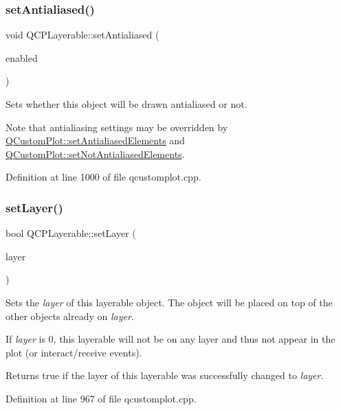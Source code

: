 \subsubsection{\texorpdfstring{set\+Antialiased()}{setAntialiased()}}
{\footnotesize\ttfamily void Q\+C\+P\+Layerable\+::set\+Antialiased (\begin{DoxyParamCaption}\item[{bool}]{enabled }\end{DoxyParamCaption})}

Sets whether this object will be drawn antialiased or not.

Note that antialiasing settings may be overridden by \hyperlink{class_q_custom_plot_af6f91e5eab1be85f67c556e98c3745e8}{Q\+Custom\+Plot\+::set\+Antialiased\+Elements} and \hyperlink{class_q_custom_plot_ae10d685b5eabea2999fb8775ca173c24}{Q\+Custom\+Plot\+::set\+Not\+Antialiased\+Elements}. 

Definition at line 1000 of file qcustomplot.\+cpp.

\mbox{\label{class_q_c_p_layerable_ab0d0da6d2de45a118886d2c8e16d5a54}} 
\subsubsection{\texorpdfstring{set\+Layer()}{setLayer()}\hspace{0.1cm}{\footnotesize\ttfamily [1/2]}}
{\footnotesize\ttfamily bool Q\+C\+P\+Layerable\+::set\+Layer (\begin{DoxyParamCaption}\item[{\hyperlink{class_q_c_p_layer}{Q\+C\+P\+Layer} $\ast$}]{layer }\end{DoxyParamCaption})}

Sets the {\itshape layer} of this layerable object. The object will be placed on top of the other objects already on {\itshape layer}.

If {\itshape layer} is 0, this layerable will not be on any layer and thus not appear in the plot (or interact/receive events).

Returns true if the layer of this layerable was successfully changed to {\itshape layer}. 

Definition at line 967 of file qcustomplot.\+cpp.

\mbox{\label{class_q_c_p_layerable_ab25a0e7b897993b44447caee0f142083}} 
